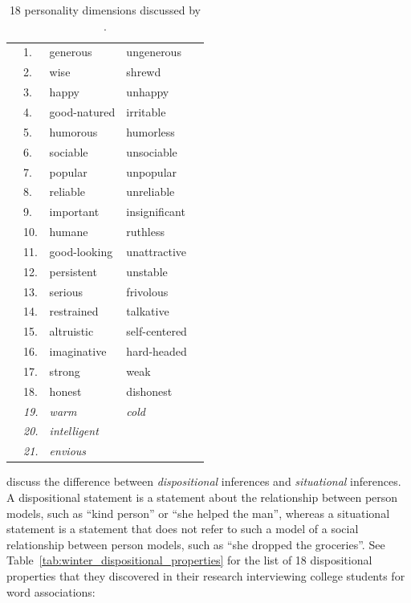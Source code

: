 \begin{table}
  \myfloatalign
  \begin{tabularx}{\textwidth}{XlllX}
    & 1.         & generous           & ungenerous    & \\
    & 2.         & wise               & shrewd        & \\
    & 3.         & happy              & unhappy       & \\
    & 4.         & good-natured       & irritable     & \\
    & 5.         & humorous           & humorless     & \\
    & 6.         & sociable           & unsociable    & \\
    & 7.         & popular            & unpopular     & \\
    & 8.         & reliable           & unreliable    & \\
    & 9.         & important          & insignificant & \\
    & 10.        & humane             & ruthless      & \\
    & 11.        & good-looking       & unattractive  & \\
    & 12.        & persistent         & unstable      & \\
    & 13.        & serious            & frivolous     & \\
    & 14.        & restrained         & talkative     & \\
    & 15.        & altruistic         & self-centered & \\
    & 16.        & imaginative        & hard-headed   & \\
    & 17.        & strong             & weak          & \\
    & 18.        & honest             & dishonest     & \\
    & \emph{19.} & \emph{warm}        & \emph{cold}   & \\
    & \emph{20.} & \emph{intelligent} & ~             & \\
    & \emph{21.} & \emph{envious}     & ~             & 
  \end{tabularx}
  \caption[18 personality dimensions]{18 personality dimensions discussed by .}
  \label{tab:asch_personality_dimensions}
\end{table}


\cite{winter:2005} discuss the difference between \emph{dispositional} inferences and \emph{situational} inferences.
A dispositional statement is a statement about the relationship between person models, such as ``kind person'' or ``she helped the man'', whereas a situational statement is a statement that does not refer to such a model of a social relationship between person models, such as ``she dropped the groceries''.
See Table~\ref{tab:winter_dispositional_properties} for the list of 18 dispositional properties that they discovered in their research interviewing college students for word associations:

